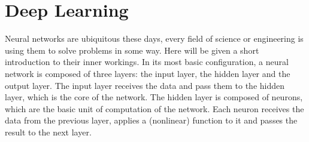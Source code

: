 \section{Deep Learning}
\label{sec:neural_network}

Neural networks are ubiquitous these days, every field of science or engineering is using them to solve problems in some way. Here will be given a short introduction to their inner workings. 
In its most basic configuration, a neural network is composed of three layers: the input layer, the hidden layer and the output layer. The input layer receives the data and pass them to the hidden layer, which is the core of the network. The hidden layer is composed of neurons, which are the basic unit of computation of the network. Each neuron receives the data from the previous layer, applies a (nonlinear) function to it and passes the result to the next layer. 